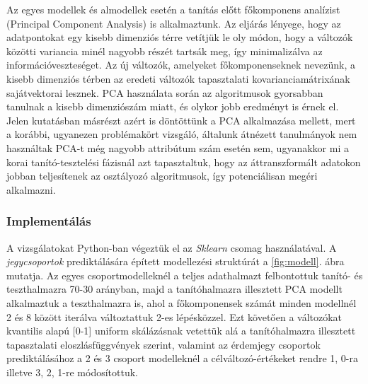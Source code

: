 \documentclass[12pt]{article}
\begin{document}
Az egyes modellek és almodellek esetén a tanítás előtt főkomponens analízist (Principal Component Analysis) is alkalmaztunk. Az eljárás lényege, hogy az adatpontokat egy kisebb dimenziós térre vetítjük le oly módon, hogy a változók közötti variancia minél nagyobb részét tartsák meg, így minimalizálva az információveszteséget\cite{PCA}. Az új változók, amelyeket főkomponenseknek nevezünk, a kisebb dimenziós térben az eredeti változók tapasztalati kovarianciamátrixának sajátvektorai lesznek. PCA használata során az algoritmusok gyorsabban tanulnak a kisebb dimenziószám miatt, és olykor jobb eredményt is érnek el. Jelen kutatásban másrészt azért is döntöttünk a PCA alkalmazása mellett, mert a korábbi, ugyanezen problémakört vizsgáló, általunk átnézett tanulmányok nem használtak PCA-t még nagyobb attribútum szám esetén sem, ugyanakkor mi a korai tanító-tesztelési fázisnál azt tapasztaltuk, hogy az áttranszformált adatokon jobban teljesítenek az osztályozó algoritmusok, így potenciálisan megéri alkalmazni.

\subsubsection*{Implementálás}

A vizsgálatokat Python-ban végeztük el az \textit{Sklearn}\cite{sklearn} csomag használatával. A \textit{jegycsoportok} prediktálására épített modellezési struktúrát a \ref{fig:modell}. ábra mutatja. Az egyes csoportmodelleknél a teljes adathalmazt felbontottuk tanító- és teszthalmazra 70-30 arányban, majd a tanítóhalmazra illesztett PCA modellt alkalmaztuk a teszthalmazra is, ahol a főkomponensek számát minden modellnél 2 és 8 között iterálva változtattuk 2-es lépésközzel. Ezt követően a változókat kvantilis alapú [0-1] uniform skálázásnak vetettük alá a tanítóhalmazra illesztett tapasztalati eloszlásfüggvények szerint, valamint az érdemjegy csoportok prediktálásához a 2 és 3 csoport modelleknél a célváltozó-értékeket rendre 1, 0-ra illetve 3, 2, 1-re módosítottuk. 
\end{document}

